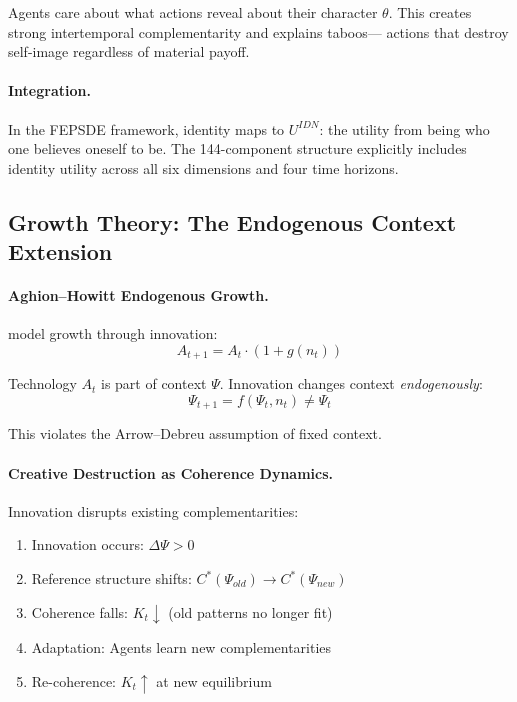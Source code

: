 \documentclass[12pt,a4paper]{article}
\begin{document}
Agents care about what actions reveal about their character $\theta$.
This creates strong intertemporal complementarity and explains taboos---
actions that destroy self-image regardless of material payoff.

\paragraph{Integration.}
In the FEPSDE framework, identity maps to $U^{IDN}$:
the utility from being who one believes oneself to be.
The 144-component structure explicitly includes identity utility
across all six dimensions and four time horizons.

\subsection{Growth Theory: The Endogenous Context Extension}

\paragraph{Aghion--Howitt Endogenous Growth.}
\citet{aghionhowitt} model growth through innovation:
\begin{equation}
  A_{t+1} = A_t \cdot (1 + g(n_t))
\end{equation}

Technology $A_t$ is part of context $\Psi$.
Innovation changes context \emph{endogenously}:
\begin{equation}
  \Psi_{t+1} = f(\Psi_t, n_t) \neq \Psi_t
\end{equation}

This violates the Arrow--Debreu assumption of fixed context.

\paragraph{Creative Destruction as Coherence Dynamics.}
Innovation disrupts existing complementarities:
\begin{enumerate}
  \item Innovation occurs: $\Delta \Psi > 0$
  \item Reference structure shifts: $C^*(\Psi_{old}) \to C^*(\Psi_{new})$
  \item Coherence falls: $K_t \downarrow$ (old patterns no longer fit)
  \item Adaptation: Agents learn new complementarities
  \item Re-coherence: $K_t \uparrow$ at new equilibrium
\end{enumerate}
\end{document}
